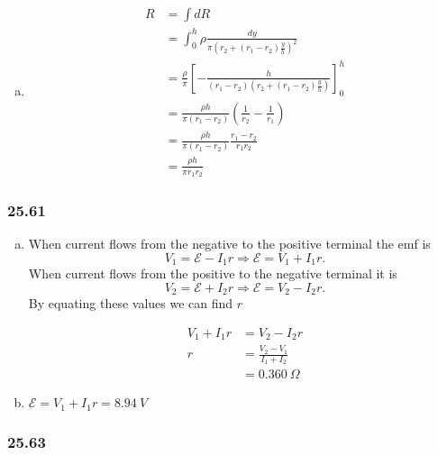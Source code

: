 \documentclass{article}
\begin{document}
\begin{enumerate}[(a)]
  \item

        \begin{align*}
          R & = \int dR                                                                                   \\
            & = \int_0^h \rho \frac{dy}{\pi (r_2 + (r_1 - r_2) \frac{y}{h})^2}                            \\
            & = \frac{\rho}{\pi} \left[ -\frac{h}{(r_1 - r_2)(r_2 + (r_1 - r_2) \frac{y}{h})} \right]_0^h \\
            & = \frac{\rho h}{\pi (r_1 - r_2)} \left( \frac{1}{r_2} - \frac{1}{r_1} \right)               \\
            & = \frac{\rho h}{\pi (r_1 - r_2)} \frac{r_1 - r_2}{r_1 r_2}                                  \\
            & = \frac{\rho h}{\pi r_1 r_2}
        \end{align*}
\end{enumerate}

\subsubsection{25.61}

\begin{enumerate}[(a)]
  \item When current flows from the negative to the positive terminal the emf is \[V_1 = \mathcal{E} - I_1 r \Rightarrow \mathcal{E} = V_1 + I_1 r.\] When current flows from the positive to the negative terminal it is \[V_2 = \mathcal{E} + I_2 r \Rightarrow \mathcal{E} = V_2 - I_2 r.\] By equating these values we can find $r$

        \begin{align*}
          V_1 + I_1 r & = V_2 - I_2 r                 \\
          r           & = \frac{V_2 - V_1}{I_1 + I_2} \\
                      & = \qty{0.360}{\Omega}
        \end{align*}

  \item $\mathcal{E} = V_1 + I_1 r = \qty{8.94}{V}$
\end{enumerate}

\subsubsection{25.63}
\end{document}
